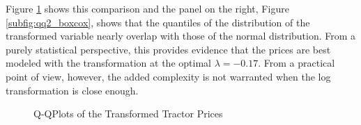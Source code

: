 Figure \ref{fig:qq2_prices} shows this comparison
and the panel on the right, Figure \ref{subfig:qq2_boxcox}, 
shows that the quantiles of the distribution of the transformed variable
nearly overlap with those of the normal distribution.
From a purely statistical perspective, 
this provides evidence that the prices are best modeled with the transformation
at the optimal $\lambda = -0.17$.
From a practical point of view, however, 
the added complexity is not warranted
when the log transformation is close enough.


\begin{figure}[!ht]
\hfill
{}

\caption{Q-QPlots of the Transformed Tractor Prices}
\label{fig:qq2_prices}
\end{figure}








% 
